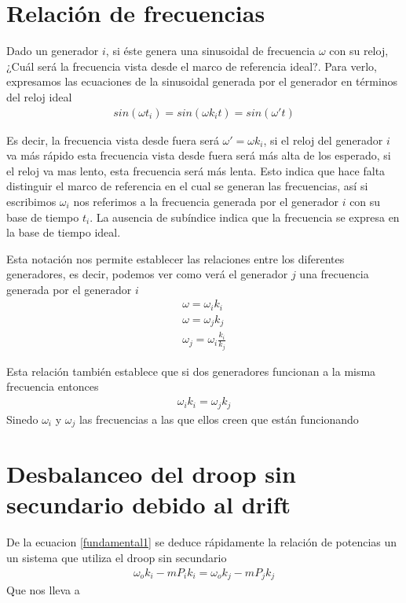 \documentclass{tufte-handout}
\begin{document}
\section{Relación de frecuencias}

Dado un generador $i$, si éste genera una sinusoidal de  frecuencia $\omega$ con su reloj, ¿Cuál será la frecuencia vista desde el marco de referencia ideal?. Para verlo, expresamos las ecuaciones de la sinusoidal generada por el generador en términos del reloj ideal
\begin{align}
    sin(\omega t_i)=sin(\omega k_i t)=sin(\omega't)
\end{align}

Es decir, la frecuencia vista desde fuera será $\omega'=\omega k_i$, si el reloj del generador $i$ va más rápido esta frecuencia vista desde fuera será más alta de los esperado, si el reloj va mas lento, esta frecuencia será más lenta. Esto indica que hace falta distinguir el marco de referencia en el cual se generan las frecuencias, así si escribimos $\omega_i$ nos referimos a la frecuencia generada por el generador $i$ con su base de tiempo $t_i$. La ausencia de subíndice indica que la frecuencia se expresa en la base de tiempo ideal.

Esta notación nos permite establecer las relaciones entre los diferentes generadores, es decir, podemos ver como verá el generador $j$ una frecuencia generada por el generador $i$
\begin{align}
\omega=\omega_ik_i\\
\omega=\omega_jk_j\\
\omega_j=\omega_i\frac{k_i}{k_j}
\end{align}

Esta relación también establece que si dos generadores funcionan a la misma frecuencia entonces\begin{align}
    \omega_ik_i=\omega_jk_j\label{fundamental1}
\end{align}
Sinedo $\omega_i$ y $\omega_j$ las frecuencias a las que ellos creen que están funcionando


\section{Desbalanceo del droop sin secundario debido al drift}
De la ecuacion \ref{fundamental1} se deduce rápidamente la relación de potencias un un sistema que utiliza el droop sin secundario
\begin{align}
\omega_ok_i-mP_ik_i=\omega_ok_j-mP_jk_j
\end{align}
Que nos lleva a 
\end{document}
